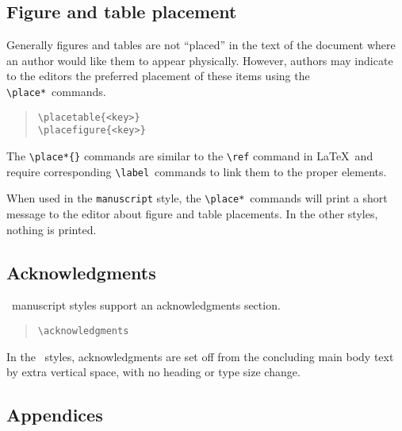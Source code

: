 \documentclass[preprint2]{aastex}
\begin{document}
\subsection{Figure and table placement}   \label{place} 
 
Generally figures and tables are not ``placed'' in the text of the 
document where an author would like them to appear physically. 
However, authors may indicate to the editors the preferred placement of 
these items using  the \verb"\place*"\  commands. 
\begin{quote} 
\begin{verbatim} 
\placetable{<key>} 
\placefigure{<key>} 
\end{verbatim} 
\end{quote} 
The \verb"\place*{"\verb"}" commands are similar to the 
\verb"\ref" 
 command in La\TeX\ 
and require corresponding \verb"\label"\ 
 commands to link them to the 
proper elements. 
 
When used in the 
\texttt{manuscript} style, the \verb"\place*"\  commands will print a short 
message to the editor about figure and table placements. 
In the other styles, nothing is printed. 
 
\subsection{Acknowledgments} 
 
\aastex\ manuscript styles support an acknowledgments section. 
\begin{quote} 
\begin{verbatim} 
\acknowledgments 
\end{verbatim} 
\end{quote} 
In the \aastex\ styles, acknowledgments are set off from the 
concluding main body text by extra vertical space, 
with no heading or type size change. 
 
\subsection{Appendices} 
 
\end{document}
